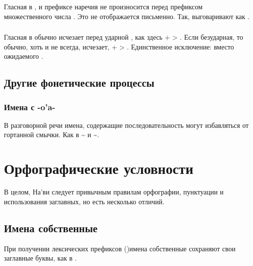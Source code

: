 \subsubsection{} Гласная  в ,  и префиксе наречия  не произносится перед префиксом множественного числа . Это не отображается письменно.  Так,   выговаривают как
. \label{l-and-s:elision-i}

\subsubsection{} Гласная в  обычно исчезает перед ударной , как здесь  +  > . Если 
безударная, то обычно, хоть и не всегда, исчезает,  +
 > . Единственное исключение:  вместо ожидаемого .

\subsection{Другие фонетические процессы}

\subsubsection{Имена с -o'a-} \label{names-with-oa}
В разговорной речи имена, содержащие последовательность  могут избавляться от гортанной смычки. Как в  \textasciitilde{}  
и  \textasciitilde {}.


\section{Орфографические условности}
\noindent В целом, На'ви следует привычным правилам орфографии, пунктуации и использования заглавных, но есть несколько отличий.

\subsection{Имена собственные} При получении лексических префиксов
()имена собственные сохраняют свои заглавные буквы, как в .

